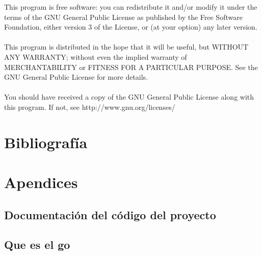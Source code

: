 \documentclass[12pt,a4paper]{report}
\begin{document}
This program is free software: you can redistribute it and/or modify it under the terms of the GNU General Public License as published by the Free Software Foundation, either version 3 of the License, or (at your option) any later version. \\
\\
This program is distributed in the hope that it will be useful, but WITHOUT ANY WARRANTY; without even the implied warranty of MERCHANTABILITY or FITNESS FOR A PARTICULAR PURPOSE.  See the GNU General Public License for more details. \\
\\
You should have received a copy of the GNU General Public License along with this program.  If not, see http://www.gnu.org/licenses/



\chapter{Bibliografía}


\chapter{Apendices}
\section{Documentación del código del proyecto}
\section{Que es el go}
\end{document}
